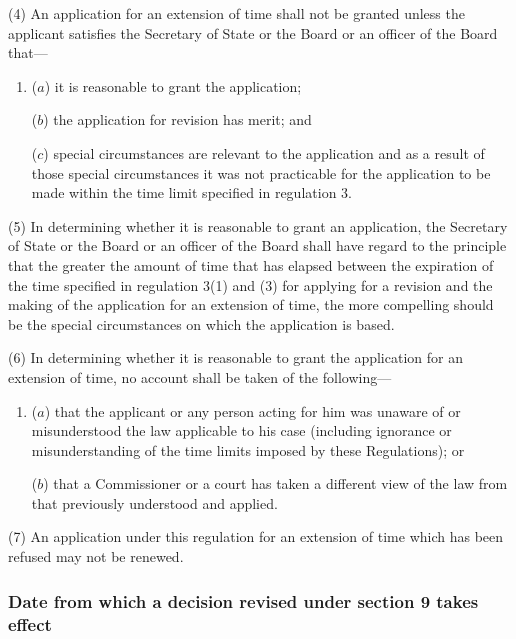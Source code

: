 \documentclass[12pt,a4paper]{article}
\begin{document}
(4) An application for an extension of time shall not be granted unless the applicant satisfies the Secretary of State 
or the Board or an officer of the Board  %
that—
\begin{enumerate}\item[]
($a$) it is reasonable to grant the application;

($b$) the application for revision has merit; and

($c$) special circumstances are relevant to the application and as a result of those special circumstances it was not practicable for the application to be made within the time limit specified in regulation 3.
\end{enumerate}

(5) In determining whether it is reasonable to grant an application, the Secretary of State 
or the Board or an officer of the Board  %
shall have regard to the principle that the greater the amount of time that has elapsed between the expiration of the time specified in regulation 3(1) and (3) for applying for a revision and the making of the application for an extension of time, the more compelling should be the special circumstances on which the application is based.

(6) In determining whether it is reasonable to grant the application for an extension of time, no account shall be taken of the following—
\begin{enumerate}\item[]
($a$) that the applicant or any person acting for him was unaware of or misunderstood the law applicable to his case (including ignorance or misunderstanding of the time limits imposed by these Regulations); or

($b$) that a Commissioner or a court has taken a different view of the law from that previously understood and applied.
\end{enumerate}

(7) An application under this regulation for an extension of time which has been refused may not be renewed.


\subsubsection[5. Date from which a decision revised under section 9 takes effect]{Date from which a decision revised under section 9 takes effect}
\end{document}

